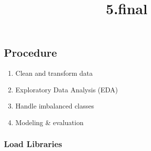 \documentclass[11pt]{article}
\title{5.final}
\providecommand{\tightlist}{%
      \setlength{\itemsep}{0pt}\setlength{\parskip}{0pt}}
\begin{document}
    
    
    \maketitle
    
    

    
    \hypertarget{procedure}{%
\subsection{Procedure}\label{procedure}}

\begin{enumerate}
\def\labelenumi{\arabic{enumi}.}
\tightlist
\item
  Clean and transform data
\item
  Exploratory Data Analysis (EDA)
\item
  Handle imbalanced classes
\item
  Modeling \& evaluation
\end{enumerate}

    \hypertarget{load-libraries}{%
\subsubsection{Load Libraries}\label{load-libraries}}
\end{document}
